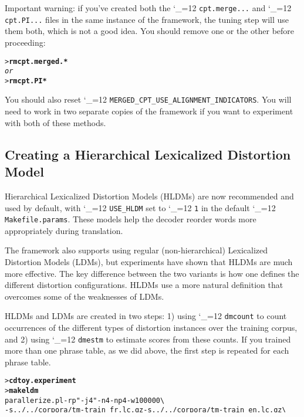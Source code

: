 \documentclass[11pt,letterpaper]{article}
\newcommand{\bs}{\textbackslash{}}
\def\code{\begingroup\catcode`\_=12 \codex}
\newcommand{\codex}[1]{\texttt{#1}\endgroup}
\begin{document}
Important warning: if you've created both the \code{cpt.merge...} and
\code{cpt.PI...} files in the same instance of the framework, the tuning step
will use them both, which is not a good idea. You should remove one or the
other before proceeding:
\begin{small}
\begin{alltt}
   > \textbf{rm cpt.merged.*}
\emph{or}
   > \textbf{rm cpt.PI*}
\end{alltt}
\end{small}
You should also reset \code{MERGED_CPT_USE_ALIGNMENT_INDICATORS}.
You will need to work in two separate copies of the framework if you want to
experiment with both of these methods.

\subsection{Creating a Hierarchical Lexicalized Distortion Model} \label{LDM}

Hierarchical Lexicalized Distortion Models (HLDMs) are now recommended and used by default,
with \code{USE_HLDM} set to \code{1} in the default \code{Makefile.params}.
These models help the decoder reorder words more appropriately during
translation.

The framework also supports using regular (non-hierarchical) Lexicalized
Distortion Models (LDMs), but experiments have shown that HLDMs are much
more effective.  The key difference between
the two variants is how one defines the different distortion configurations.
HLDMs use a more natural definition that overcomes some of the weaknesses of
LDMs.

HLDMs and LDMs are created in two steps: 1) using \code{dmcount} to count occurrences of the
different types of distortion instances over the training corpus,
and 2) using \code{dmestm} to estimate scores from these counts.
If you trained more than one phrase table, as we did
above, the first step is repeated for each phrase table.
\begin{small}
\begin{alltt}
   > \textbf{cd toy.experiment}
   > \textbf{make ldm}
   parallerize.pl -rp "-j 4" -n 4 -np 4 -w 100000 \bs
      -s ../../corpora/tm-train_fr.lc.gz -s ../../corpora/tm-train_en.lc.gz \bs
      -s ./../wal/tm-train.hmm3.fr2en.align.gz \bs
      -merge 'merge_multi_column_counts -' \bs
      'dmcount -ext -v -m 8 -hier \bs
         ../../corpora/tm-train_fr.lc.gz ../../corpora/tm-train_en.lc.gz \bs
         ./../wal/tm-train.hmm3.fr2en.align.gz | li-sort.sh > hldm.hmm3.counts.gz'
   parallelize.pl [...] 'dmcount [...] > hldm.ibm4.counts.gz'
   parallelize.pl [...] 'dmcount [...] > hldm.ibm2.counts.gz'
   merge_multi_column_counts -fillup - \bs
      hldm.ibm4.counts.gz hldm.hmm3.counts.gz hldm.ibm2.counts.gz \bs
      | dmestm -s -g hldm.ibm4+hmm3+ibm2.fr2en.bkoff \bs
        -wtu 5 -wtg 5 -wt1 5 -wt2 5 \bs
      | gzip > hldm.ibm4+hmm3+ibm2.fr2en.gz
\end{alltt}
\end{small}
\end{document}
